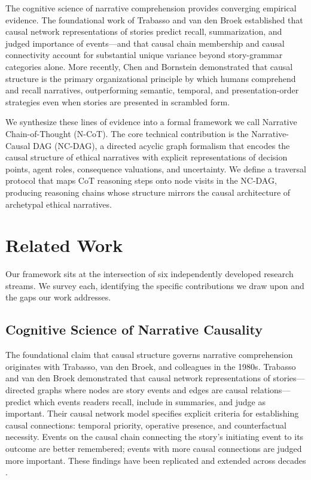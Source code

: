 \documentclass[11pt,letterpaper]{article}
\theoremstyle{defn}
\begin{document}
The cognitive science of narrative comprehension provides converging empirical evidence. The foundational work of Trabasso and van den Broek \citeyearpar{trabasso1985causal} established that causal network representations of stories predict recall, summarization, and judged importance of events---and that causal chain membership and causal connectivity account for substantial unique variance beyond story-grammar categories alone. More recently, Chen and Bornstein \citeyearpar{chen2024causal} demonstrated that causal structure is the primary organizational principle by which humans comprehend and recall narratives, outperforming semantic, temporal, and presentation-order strategies even when stories are presented in scrambled form.

We synthesize these lines of evidence into a formal framework we call Narrative Chain-of-Thought (N-CoT). The core technical contribution is the Narrative-Causal DAG (NC-DAG), a directed acyclic graph formalism that encodes the causal structure of ethical narratives with explicit representations of decision points, agent roles, consequence valuations, and uncertainty. We define a traversal protocol that maps CoT reasoning steps onto node visits in the NC-DAG, producing reasoning chains whose structure mirrors the causal architecture of archetypal ethical narratives.

\section{Related Work}

Our framework sits at the intersection of six independently developed research streams. We survey each, identifying the specific contributions we draw upon and the gaps our work addresses.

\subsection{Cognitive Science of Narrative Causality}

The foundational claim that causal structure governs narrative comprehension originates with Trabasso, van den Broek, and colleagues in the 1980s. Trabasso and van den Broek \citeyearpar{trabasso1985causal} demonstrated that causal network representations of stories---directed graphs where nodes are story events and edges are causal relations---predict which events readers recall, include in summaries, and judge as important. Their causal network model specifies explicit criteria for establishing causal connections: temporal priority, operative presence, and counterfactual necessity. Events on the causal chain connecting the story's initiating event to its outcome are better remembered; events with more causal connections are judged more important. These findings have been replicated and extended across decades \citep{trabasso1985relatedness,vandenbroek1988,fletcher1988,goldman1999}.
\end{document}
